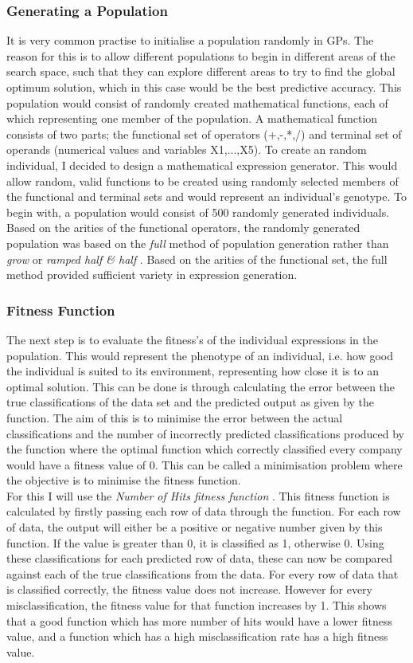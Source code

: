 \documentclass[11pt]{article}
\begin{document}
\subsubsection{Generating a Population}
It is very common practise to initialise a population randomly in GPs. The reason for this is to allow different populations to begin in different areas of the search space, such that they can explore different areas to try to find the global optimum solution, which in this case would be the best predictive accuracy.  This population would consist of randomly created mathematical functions, each of which representing one member of the population. A mathematical function consists of two parts; the functional set of operators (+,-,*,/) and terminal set of operands (numerical values and variables X1,...,X5). To create an random individual, I decided to design a mathematical expression generator. This would allow random, valid functions to be created using randomly selected members of the functional and terminal sets and would represent an individual's genotype. To begin with, a population would consist of 500 randomly generated individuals. Based on the arities of the functional operators, the randomly generated population was based on the \textit{full} method of population generation \cite{?} rather than \textit{grow} or \textit{ramped half \& half} \cite{?}. Based on the arities of the functional set, the full method provided sufficient variety in expression generation.
\subsubsection{Fitness Function}
The next step is to evaluate the fitness's of the individual expressions in the population. This would represent the phenotype of an individual, i.e. how good the individual is suited to its environment, representing how close it is to an optimal solution. This can be done is through calculating the error between the true classifications of the data set and the predicted output as given by the function. The aim of this is to minimise the error between the actual classifications and the number of incorrectly predicted classifications produced by the function where the optimal function which correctly classified every company would have a fitness value of 0. This can be called a minimisation problem where the objective is to minimise the fitness function. \\
For this I will use the \textit{Number of Hits fitness function} \cite{?} . This fitness function is calculated by firstly passing each row of data through the function. For each row of data, the output will either be a positive or negative number given by this function. If the value is greater than 0, it is classified as 1, otherwise 0. Using these classifications for each predicted row of data, these can now be compared against each of the true classifications from the data. For every row of data that is classified correctly, the fitness value does not increase. However for every misclassification, the fitness value for that function increases by 1. This shows that a good function which has more number of hits would have a lower fitness value, and a function which has a high misclassification rate has a high fitness value. 
\end{document}
